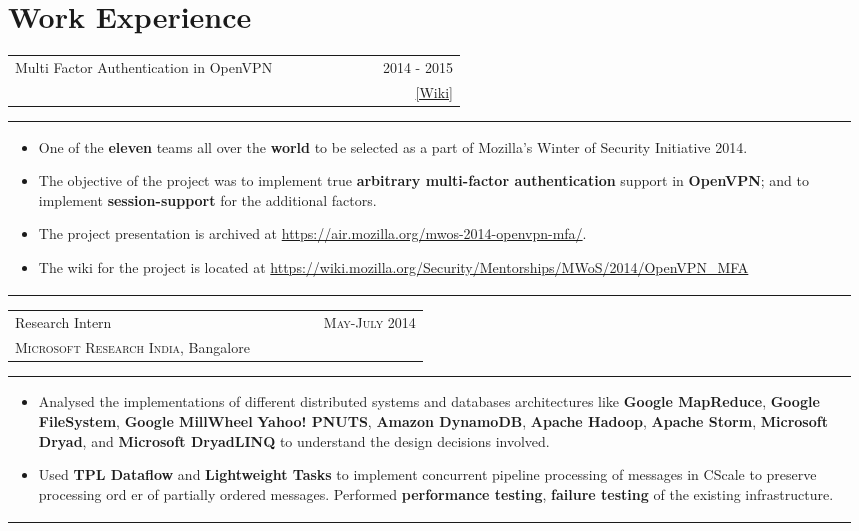 \documentclass[a4paper]{article} %
\newcommand{\verticalspacing}{-0.25cm}
\newcommand{\bulletspace}{0.7cm}
\newcommand{\cproject}[5]{
    \begin{tabular}{p{0.60\linewidth}r}
        \textcolor{NavyBlue}{\small #2} & \multicolumn{1}{m{7.3cm}}{\raggedleft \small {\textsc{#1}}}\\
        \small {#3} & \small {#4}
    \end{tabular}
    \begin{tabular}{p{0.98\linewidth}}
    \vspace{-0.3cm}
        \small{#5}
    \end{tabular}
    \vspace{\verticalspacing{}}
}
\begin{document}
\section{Work Experience}
\cproject
    {2014 - 2015}
    {Multi Factor Authentication in OpenVPN}
    {\textsc{\raggedright Mozilla Winter of Security}, Guillaume Destuynder, Professor Dheeraj Sanghi}
    {\href{https://wiki.mozilla.org/Security/Mentorships/MWoS/2014/OpenVPN\_MFA} {[Wiki]} }
    {
        \begin{itemize}[leftmargin=\bulletspace{}]
          \item One of the \textbf{eleven} teams all over the \textbf{world} to be selected as a part of Mozilla's Winter of Security Initiative 2014.
          \item The objective of the project was to implement true \textbf{arbitrary multi-factor authentication} support in
              \textbf{OpenVPN}; and to implement \textbf{session-support} for the additional factors.
          \item The project presentation is archived at
              \href{https://air.mozilla.org/mwos-2014-openvpn-mfa/}{https://air.mozilla.org/mwos-2014-openvpn-mfa/}.
          \item The wiki for the project is located at \href{https://wiki.mozilla.org/Security/Mentorships/MWoS/2014/OpenVPN\_MFA} {https://wiki.mozilla.org/Security/Mentorships/MWoS/2014/OpenVPN\_MFA}
      \end{itemize}
    }


\cproject
      {May-July 2014}
      {Research Intern}
      {\textsc{Microsoft Research India}, Bangalore}
      {}
      {
          \begin{itemize}[leftmargin=\bulletspace{}]
              \item Analysed the implementations of different distributed systems and databases architectures like
                  \textbf{Google MapReduce}, \textbf{Google FileSystem}, \textbf{Google MillWheel} \textbf{Yahoo! PNUTS},
                  \textbf{Amazon DynamoDB}, \textbf{Apache Hadoop}, \textbf{Apache Storm}, \textbf{Microsoft Dryad},
                  and \textbf{Microsoft DryadLINQ} to understand the design decisions involved.
              \item Used \textbf{TPL Dataflow} and \textbf{Lightweight Tasks} to implement concurrent pipeline
                  processing of messages in CScale to preserve processing ord
                  er of partially ordered messages.
                  Performed \textbf{performance testing}, \textbf{failure testing} of the existing infrastructure.
          \end{itemize}
     }
\end{document}
